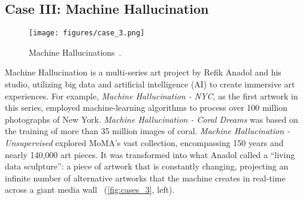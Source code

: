 \subsection{Case III: Machine Hallucination}
\label{ssection:machine}

\begin{figure}[h]
 \centering
 \texttt{[image: figures/case\_3.png]}
 \vspace{-2em}
 \caption{Machine Hallucinations~\cite{machine}.}
 \label{fig:cases_3}
 \vspace{-2em}
\end{figure}

Machine Hallucination is a multi-series art project by Refik Anadol and his studio, utilizing big data and artificial intelligence (AI) to create immersive art experiences.
For example, \textit{Machine Hallucination - NYC}, as the first artwork in this series, employed machine-learning algorithms to process over 100 million photographs of New York. \textit{Machine Hallucination - Coral Dreams} was based on the training of more than 35 million images of coral. \textit{Machine Hallucination - Unsupervised} explored MoMA's vast collection, encompassing 150 years and nearly 140,000 art pieces. It was transformed into what Anadol called a ``living data sculpture'': a piece of artwork that is constantly changing, projecting an infinite number of alternative artworks that the machine creates in real-time across a giant media wall~\cite{yahoo} (\autoref{fig:cases_3}, left).
